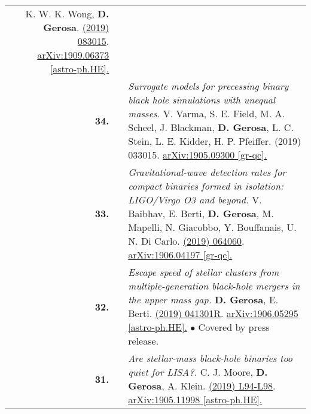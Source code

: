 {\begin{longtable}{rp{0.3cm}p{15.8cm}}
\newline{}
K. W. K. Wong, \textbf{D. Gerosa}.
\newline{}
\href{https://journals.aps.org/prd/abstract/10.1103/PhysRevD.100.083015}{\prd 100 (2019) 083015}. \href{https://arxiv.org/abs/1909.06373}{arXiv:1909.06373 [astro-ph.HE].}
\vspace{0.09cm}\\
%
\textbf{34.} & & \textit{Surrogate models for precessing binary black hole simulations with unequal masses.}
\newline{}
V. Varma, S. E. Field, M. A. Scheel, J. Blackman, \textbf{D. Gerosa}, L. C. Stein, L. E. Kidder, H. P. Pfeiffer.
\newline{}
{\prr 1 (2019) 033015}. \href{https://arxiv.org/abs/1905.09300}{arXiv:1905.09300 [gr-qc].}
\vspace{0.09cm}\\
%
\textbf{33.} & & \textit{Gravitational-wave detection rates for compact binaries formed in isolation: LIGO/Virgo O3 and beyond.}
\newline{}
V. Baibhav, E. Berti, \textbf{D. Gerosa}, M. Mapelli, N. Giacobbo, Y. Bouffanais, U. N. Di Carlo.
\newline{}
\href{https://journals.aps.org/prd/abstract/10.1103/PhysRevD.100.064060}{\prd 100 (2019) 064060}. \href{https://arxiv.org/abs/1906.04197}{arXiv:1906.04197 [gr-qc].}
\vspace{0.09cm}\\
%
\textbf{32.} & & \textit{Escape speed of stellar clusters from multiple-generation black-hole mergers in the upper mass gap.}
\newline{}
\textbf{D. Gerosa}, E. Berti.
\newline{}
\href{https://journals.aps.org/prd/abstract/10.1103/PhysRevD.100.041301}{\prdrc 100 (2019) 041301R}. \href{https://arxiv.org/abs/1906.05295}{arXiv:1906.05295 [astro-ph.HE].}
\newline{}
\textcolor{color1}{$\bullet$} Covered by press release.
\vspace{0.09cm}\\
%
\textbf{31.} & & \textit{Are stellar-mass black-hole binaries too quiet for LISA?.}
\newline{}
C. J. Moore, \textbf{D. Gerosa}, A. Klein.
\newline{}
\href{https://doi.org/10.1093/mnrasl/slz104}{\mnrasl 488 (2019) L94-L98}. \href{https://arxiv.org/abs/1905.11998}{arXiv:1905.11998 [astro-ph.HE].}
\vspace{0.09cm}\\

\end{longtable}}
